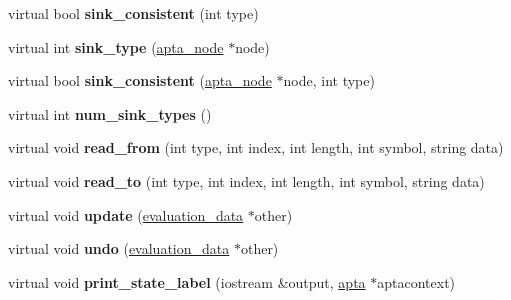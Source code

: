 \begin{DoxyCompactItemize}
\item 
virtual bool {\bfseries sink\+\_\+consistent} (int type)\hypertarget{classevaluation__data_ad3045eb73b3d82d657e808aa33848722}{}\label{classevaluation__data_ad3045eb73b3d82d657e808aa33848722}

\item 
virtual int {\bfseries sink\+\_\+type} (\hyperlink{classapta__node}{apta\+\_\+node} $\ast$node)\hypertarget{classevaluation__data_a185bc8febf0cf0a8bd0a967e911c523c}{}\label{classevaluation__data_a185bc8febf0cf0a8bd0a967e911c523c}

\item 
virtual bool {\bfseries sink\+\_\+consistent} (\hyperlink{classapta__node}{apta\+\_\+node} $\ast$node, int type)\hypertarget{classevaluation__data_abb8607435f006cb15269f252cd18b9da}{}\label{classevaluation__data_abb8607435f006cb15269f252cd18b9da}

\item 
virtual int {\bfseries num\+\_\+sink\+\_\+types} ()\hypertarget{classevaluation__data_ac863fd6a529ba41a87bdeac91cb981fb}{}\label{classevaluation__data_ac863fd6a529ba41a87bdeac91cb981fb}

\item 
virtual void {\bfseries read\+\_\+from} (int type, int index, int length, int symbol, string data)\hypertarget{classevaluation__data_a0a8c104ebb8a162aebc5c995e218bfab}{}\label{classevaluation__data_a0a8c104ebb8a162aebc5c995e218bfab}

\item 
virtual void {\bfseries read\+\_\+to} (int type, int index, int length, int symbol, string data)\hypertarget{classevaluation__data_a417c3f0bae4461bfc909f4cac06c4999}{}\label{classevaluation__data_a417c3f0bae4461bfc909f4cac06c4999}

\item 
virtual void {\bfseries update} (\hyperlink{classevaluation__data}{evaluation\+\_\+data} $\ast$other)\hypertarget{classevaluation__data_a0fbcb1e436bb6eec367ac06074dae326}{}\label{classevaluation__data_a0fbcb1e436bb6eec367ac06074dae326}

\item 
virtual void {\bfseries undo} (\hyperlink{classevaluation__data}{evaluation\+\_\+data} $\ast$other)\hypertarget{classevaluation__data_aa8e9fd6aa419f7c878df97ec447d61dd}{}\label{classevaluation__data_aa8e9fd6aa419f7c878df97ec447d61dd}

\item 
virtual void {\bfseries print\+\_\+state\+\_\+label} (iostream \&output, \hyperlink{classapta}{apta} $\ast$aptacontext)\hypertarget{classevaluation__data_a549cdf431c5b5114f24ea1be560a3945}{}\label{classevaluation__data_a549cdf431c5b5114f24ea1be560a3945}


\end{DoxyCompactItemize}
